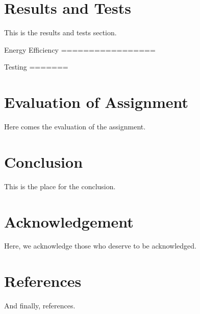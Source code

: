 \documentclass{article}
\begin{document}
\part{Results and Tests}

This is the results and tests section.

Energy Efficiency
=================

Testing
=======

\part{Evaluation of Assignment}

Here comes the evaluation of the assignment.

\part{Conclusion}

This is the place for the conclusion.

\part{Acknowledgement}

Here, we acknowledge those who deserve to be acknowledged.

\part{References}

And finally, references.
\end{document}
